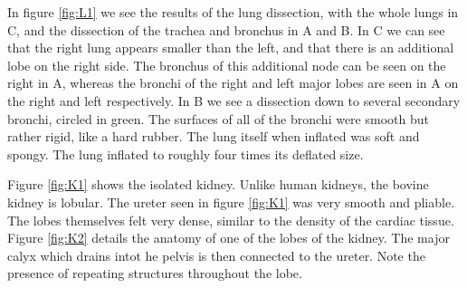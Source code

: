 \documentclass[12pt]{article}
\begin{document}
\par{}
In figure \ref{fig:L1} we see the results of the lung dissection, with the whole lungs in C, and the dissection of the trachea and bronchus in A and B. In C we can see that the right lung appears smaller than the left, and that there is an additional lobe on the right side. The bronchus of this additional node can be seen on the right in A, whereas the bronchi of the right and left major lobes are seen in A on the right and left respectively. In B we see a dissection down to several secondary bronchi, circled in green. The surfaces of all of the bronchi were smooth but rather rigid, like a hard rubber. The lung itself when inflated was soft and spongy. The lung inflated to roughly four times its deflated size.
\par{}
Figure \ref{fig:K1} shows the isolated kidney. Unlike human kidneys, the bovine kidney is lobular. The ureter seen in figure \ref{fig:K1} was very smooth and pliable. The lobes themselves felt very dense, similar to the density of the cardiac tissue. Figure \ref{fig:K2} details the anatomy of one of the lobes of the kidney. The major calyx which drains intot he pelvis is then connected to the ureter. Note the presence of repeating structures throughout the lobe.
\end{document}
